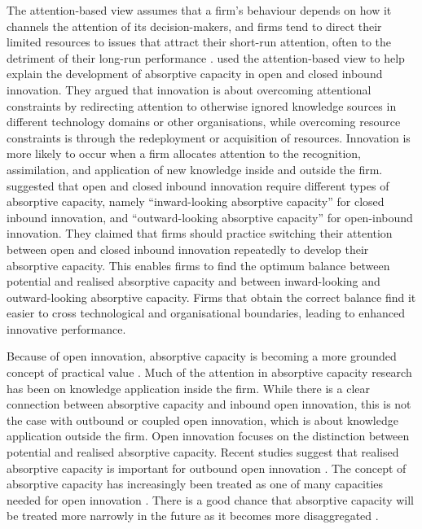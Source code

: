 The attention-based view assumes that a firm's behaviour depends on how it channels the attention of its decision-makers, and firms tend to direct their limited resources to issues that attract their short-run attention, often to the detriment of their long-run performance \citep{ocasio1997towards}. \citet{kim2016balancing} used the attention-based view to help explain the development of absorptive capacity in open and closed inbound innovation. They argued that innovation is about overcoming attentional constraints by redirecting attention to otherwise ignored knowledge sources in different technology domains or other organisations, while overcoming resource constraints is through the redeployment or acquisition of resources. Innovation is more likely to occur when a firm allocates attention to the recognition, assimilation, and application of new knowledge inside and outside the firm. \citet{kim2016balancing} suggested that open and closed inbound innovation require different types of absorptive capacity, namely \enquote{inward-looking absorptive capacity} for closed inbound innovation, and \enquote{outward-looking absorptive capacity} for open-inbound innovation. They claimed that firms should practice switching their attention between open and closed inbound innovation repeatedly to develop their absorptive capacity. This enables firms to find the optimum balance between potential and realised absorptive capacity and between inward-looking and outward-looking absorptive capacity. Firms that obtain the correct balance find it easier to cross technological and organisational boundaries, leading to enhanced innovative performance. \medskip

Because of open innovation, absorptive capacity is becoming a more grounded concept of practical value \citep{vanhaverbeke2007connecting,lichtenthaler2009capability}. Much of the attention in absorptive capacity research has been on knowledge application inside the firm. While there is a clear connection between absorptive capacity and inbound open innovation, this is not the case with outbound or coupled open innovation, which is about knowledge application outside the firm. Open innovation focuses on the distinction between potential and realised absorptive capacity. Recent studies suggest that realised absorptive capacity is important for outbound open innovation \citep[e.g.][]{kim2016balancing,xia2016unpacking}. The concept of absorptive capacity has increasingly been treated as one of many capacities needed for open innovation \citep[e.g.][]{lichtenthaler2009capability,lichtenthaler2010technology,robertson2012managing,ahn2016beyond}. There is a good chance that absorptive capacity will be treated more narrowly in the future as it becomes more disaggregated \citep[viz.][]{lichtenthaler2009capability}. \medskip

